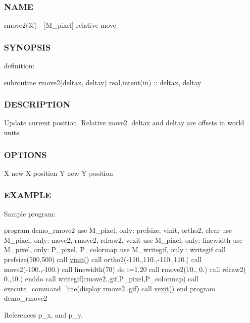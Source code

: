 \subsubsection*{N\+A\+ME}

rmove2(3f) -\/ \mbox{[}M\+\_\+pixel\mbox{]} relative move 

\subsubsection*{S\+Y\+N\+O\+P\+S\+IS}

definition\+:

subroutine rmove2(deltax, deltay) real,intent(in) \+:\+: deltax, deltay

\subsubsection*{D\+E\+S\+C\+R\+I\+P\+T\+I\+ON}

Update current position. Relative move2. deltax and deltay are offsets in world units. \subsubsection*{O\+P\+T\+I\+O\+NS}

X new X position Y new Y position \subsubsection*{E\+X\+A\+M\+P\+LE}

Sample program\+:

program demo\+\_\+rmove2 use M\+\_\+pixel, only\+: prefsize, vinit, ortho2, clear use M\+\_\+pixel, only\+: move2, rmove2, rdraw2, vexit use M\+\_\+pixel, only\+: linewidth use M\+\_\+pixel, only\+: P\+\_\+pixel, P\+\_\+colormap use M\+\_\+writegif, only \+: writegif call prefsize(500,500) call \hyperlink{namespacem__pixel_ac03ca8f23fdadb60599b6ea4dc87a6d9}{vinit()} call ortho2(-\/110.,110.,-\/110.,110.) call move2(-\/100.,-\/100.) call linewidth(70) do i=1,20 call rmove2(10., 0.) call rdraw2( 0.,10.) enddo call writegif(\textquotesingle{}rmove2..\+gif\textquotesingle{},P\+\_\+pixel,P\+\_\+colormap) call execute\+\_\+command\+\_\+line(\textquotesingle{}display rmove2..\+gif\textquotesingle{}) call \hyperlink{namespacem__pixel_a19ad6b65752322b0029a62cc0ebec3e8}{vexit()} end program demo\+\_\+rmove2 

References p\+\_\+x, and p\+\_\+y.


